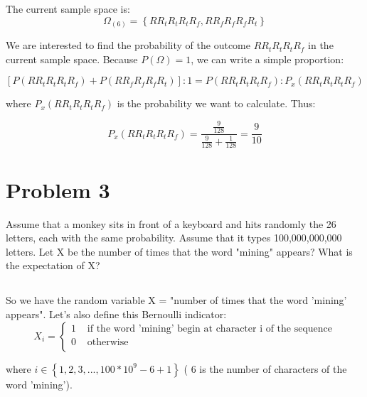 \documentclass{article}
\begin{document}
The current sample space is:
\begin{equation} \label{eq:sampleSpace2.5}
\Omega_{(6)} =  \left\{ RR_{t}R_{t}R_{t}R_{f}, RR_{f}R_{f}R_{f}R_{t}  \right\}
\end{equation}

We are interested to find the probability of the outcome $RR_{t}R_{t}R_{t}R_{f}$ in the current sample space. Because $P(\Omega) = 1$, we can write a simple proportion:

\begin{equation} \label{eq:proportion2.5}
[P(RR_{t}R_{t}R_{t}R_{f}) + P(RR_{f}R_{f}R_{f}R_{t}) ] : 1 = P(RR_{t}R_{t}R_{t}R_{f}) : P_{x}(RR_{t}R_{t}R_{t}R_{f})
\end{equation} 

where $P_{x}(RR_{t}R_{t}R_{t}R_{f})$ is the probability we want to calculate. Thus:

\begin{equation} \label{eq:proportion2.52}
P_{x}(RR_{t}R_{t}R_{t}R_{f}) = \frac {\frac {9} {128} } {\frac {9} {128} + \frac {1} {128} } = \frac {9} {10}
\end{equation} 




\section{Problem 3}
Assume that a monkey sits in front of a keyboard and hits randomly the 26 letters, each with the same probability. Assume that it types 100,000,000,000 letters. Let X be the number of times that the word "mining" appears? What is the expectation of X?

\subsection{}
So we have the random variable X = "number of times that the word 'mining' appears". Let's also define this Bernoulli indicator:
\begin{equation} \label{eq:bernoulli}
X_{i} = 
\begin{cases}
	1 & \text{ if the word 'mining' begin at character i of the sequence} \\
	0 & \text{ otherwise } \\
\end{cases}\end{equation}

where $i \in \left\{1, 2, 3, ..., 100*10^9-6+1 \right\}$ ( 6 is the number of characters of the word 'mining').
\end{document}
